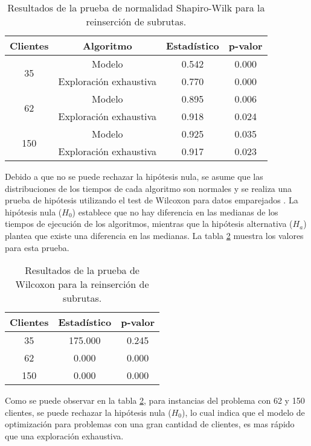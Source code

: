 \documentclass[12pt]{report}
\begin{document}
\begin{table}[h]
	\centering
	\begin{tabular}{|c|c|c|c|}
		\hline
		\textbf{Clientes} & \textbf{Algoritmo} & \textbf{Estadístico} & \textbf{p-valor} \\
		\hline
		\multirow{2}{*}{35} & Modelo & 0.542 & 0.000 \\
		& Exploración exhaustiva & 0.770 & 0.000 \\
		\hline
		\multirow{2}{*}{62} & Modelo & 0.895 & 0.006 \\
		& Exploración exhaustiva & 0.918 & 0.024 \\
		\hline
		\multirow{2}{*}{150} & Modelo & 0.925 & 0.035 \\
		& Exploración exhaustiva & 0.917 & 0.023 \\
		\hline
	\end{tabular}
	\caption{Resultados de la prueba de normalidad Shapiro-Wilk para la reinserción de subrutas.}
	\label{tab:Shapiro reincercion subrutas}
\end{table}

Debido a que no se puede rechazar la hipótesis nula, se asume que las distribuciones de los tiempos de cada algoritmo son normales y se realiza una prueba de hipótesis utilizando el test de Wilcoxon para datos emparejados \cite{ref29}. La hipótesis nula ($H_0$) establece que no hay diferencia en las medianas de los tiempos de ejecución de los algoritmos, mientras que la hipótesis alternativa ($H_a$) plantea que existe una diferencia en las medianas. La tabla \ref{tab:Wilcoxon reinsercion subrutas} muestra los valores para esta prueba.

\begin{table}[h]
	\centering
	\begin{tabular}{|c|c|c|}
		\hline
		\textbf{Clientes} & \textbf{Estadístico} & \textbf{p-valor} \\
		\hline
		35  & 175.000 & 0.245 \\
		\hline
		62  & 0.000 & 0.000 \\
		\hline
		150 & 0.000 & 0.000 \\
		\hline
	\end{tabular}
	\caption{Resultados de la prueba de Wilcoxon para la reinserción de subrutas.}
	\label{tab:Wilcoxon reinsercion subrutas}
\end{table}

Como se puede observar en la tabla \ref{tab:Wilcoxon reinsercion subrutas}, para instancias del problema con 62 y 150 clientes, se puede rechazar la hipótesis nula ($H_0$), lo cual indica que el modelo de optimización para problemas con una gran cantidad de clientes, es mas rápido que una exploración exhaustiva.
\end{document}
